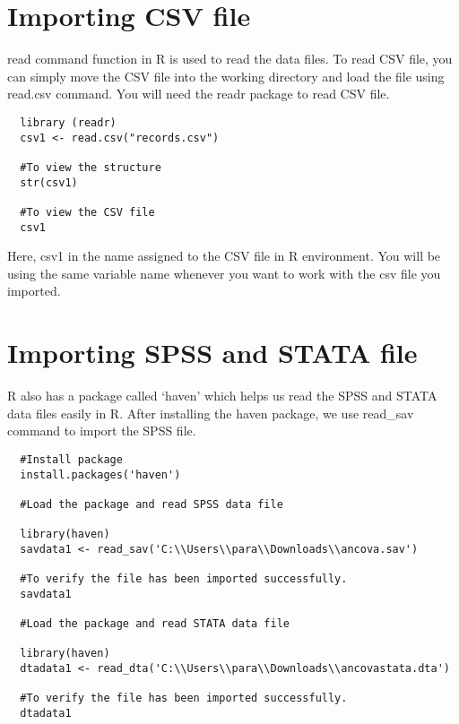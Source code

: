 \documentclass[
]{book}
\begin{document}
\hypertarget{importing-csv-file}{%
\section{Importing CSV file}\label{importing-csv-file}}

read command function in R is used to read the data files. To read CSV file, you can simply move the CSV file into the working directory and load the file using read.csv command. You will need the readr package to read CSV file.

\begin{verbatim}
  library (readr)
  csv1 <- read.csv("records.csv")
  
  #To view the structure
  str(csv1)
  
  #To view the CSV file
  csv1
\end{verbatim}

Here, csv1 in the name assigned to the CSV file in R environment. You will be using the same variable name whenever you want to work with the csv file you imported.

\hypertarget{importing-spss-and-stata-file}{%
\section{Importing SPSS and STATA file}\label{importing-spss-and-stata-file}}

R also has a package called `haven' which helps us read the SPSS and STATA data files easily in R. After installing the haven package, we use read\_sav command to import the SPSS file.

\begin{verbatim}
  #Install package
  install.packages('haven')
  
  #Load the package and read SPSS data file
  
  library(haven)
  savdata1 <- read_sav('C:\\Users\\para\\Downloads\\ancova.sav')
  
  #To verify the file has been imported successfully.
  savdata1
  
  #Load the package and read STATA data file
  
  library(haven)
  dtadata1 <- read_dta('C:\\Users\\para\\Downloads\\ancovastata.dta')
  
  #To verify the file has been imported successfully.
  dtadata1
  
\end{verbatim}
\end{document}

